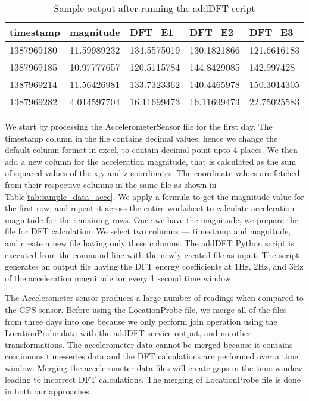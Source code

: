 \begin{table}[h]
	\centering	
	\caption{Sample output after running the addDFT script\label{tab:sample_acce_dft}}
  	\begin{tabular}{ | p{1.1cm} | p{1.3cm} | p{1.4cm} | p{1.4cm} | p{1.4cm} | }
    	\hline
	    \textbf{timestamp} & \textbf{magnitude} & \textbf{DFT\_E1} & \textbf{DFT\_E2} & \textbf{DFT\_E3} \\ \hline
		1387969180 & 11.59989232 & 134.5575019 & 130.1821866 & 121.6616183 \\ \hline
		1387969185 & 10.97777657 & 120.5115784 & 144.8429085 & 142.997428 \\ \hline
		1387969214 & 11.56426981 & 133.7323362 & 140.4465978 & 150.3014305 \\ \hline
		1387969282 & 4.014597704 & 16.11699473 & 16.11699473 & 22.75025583 \\
	    \hline
  	\end{tabular}
\end{table}

We start by processing the AccelerometerSensor file for the first day. The timestamp column in the file contains decimal values; hence we change the default column format in excel, to contain decimal point upto 4 places. We then add a new column for the acceleration magnitude, that is calculated as the sum of squared values of the x,y and z coordinates. The coordinate values are fetched from their respective columns in the same file as shown in Table\ref{tab:sample_data_acce}. We apply a formula to get the magnitude value for the first row, and repeat it across the entire worksheet to calculate acceleration magnitude for the remaining rows. Once we have the magnitude, we prepare the file for DFT calculation. We select two columns --- timestamp and magnitude, and create a new file having only these columns. The addDFT Python script is executed from the command line with the newly created file as input. The script generates an output file having the DFT energy coefficients at 1Hz, 2Hz, and 3Hz of the acceleration magnitude for every 1 second time window.

The Accelerometer sensor produces a large number of readings when compared to the GPS sensor. Before using the LocationProbe file, we merge all of the files from three days into one because we only perform join operation using the LocationProbe data with the addDFT service output, and no other transformations. The accelerometer data cannot be merged because it contains continuous time-series data and the DFT calculations are performed over a time window. Merging the accelerometer data files will create gaps in the time window leading to incorrect DFT calculations. The merging of LocationProbe file is done in both our approaches. 

